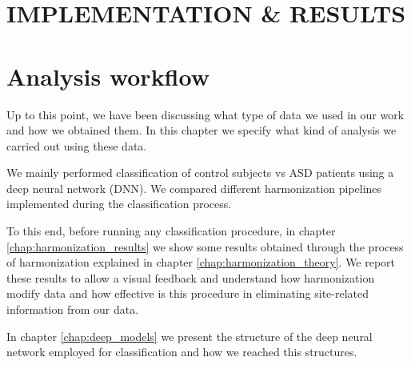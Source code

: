 \documentclass[11pt]{report}
\begin{document}
\newpage





\chapter*{IMPLEMENTATION \& RESULTS}
\chapter{Analysis workflow}\label{chap:analysis_workflow}
Up to this point, we have been discussing what type of data we used in our work and how we obtained them.
In this chapter we specify what kind of analysis we carried out using these data.

We mainly performed classification of control subjects vs ASD patients using a deep neural network (DNN).
We compared different harmonization pipelines implemented during the classification process.

To this end, before running any classification procedure, in chapter \ref{chap:harmonization_results} we show some results obtained through the process of harmonization explained in chapter \ref{chap:harmonization_theory}.
We report these results to allow a visual feedback and understand how harmonization modify data and how effective is this procedure in eliminating site-related information from our data.

In chapter \ref{chap:deep_models} we present the structure of the deep neural network employed for classification and how we reached this structures.
\end{document}
